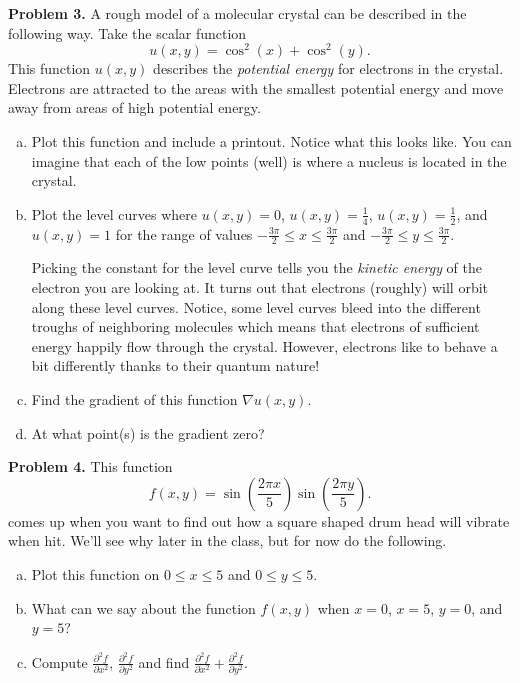 \documentclass[12pt]{report} %
\theoremstyle{definition}
\begin{document}
\noindent\textbf{Problem 3.} A rough model of a molecular crystal can be described in the following way.  Take the scalar function
\[
u(x,y)=\cos^2(x)+\cos^2(y).
\]
This function $u(x,y)$ describes the \emph{potential energy} for electrons in the crystal. Electrons are attracted to the areas with the smallest potential energy and move away from areas of high potential energy. 
\begin{enumerate}[(a)]
    \item Plot this function and include a printout.  Notice what this looks like.  You can imagine that each of the low points (well) is where a nucleus is located in the crystal.
    \item Plot the level curves where $u(x,y)=0$, $u(x,y)=\frac{1}{4}$, $u(x,y)=\frac{1}{2}$, and $u(x,y)=1$ for the range of values $-\frac{3\pi}{2}\leq x \leq \frac{3\pi}{2}$ and $-\frac{3\pi}{2}\leq y \leq \frac{3\pi}{2}$. 
    
    Picking the constant for the level curve tells you the \emph{kinetic energy} of the electron you are looking at.  It turns out that electrons (roughly) will orbit along these level curves.  Notice, some level curves bleed into the different troughs of neighboring molecules which means that electrons of sufficient energy happily flow through the crystal. However, electrons like to behave a bit differently thanks to their quantum nature!
    \item Find the gradient of this function $\nabla u(x,y)$.
    \item At what point(s) is the gradient zero? 
\end{enumerate}   
\vspace*{.5cm}


\noindent\textbf{Problem 4.} This function
\[
f(x,y)=\sin\left(\frac{2\pi x}{5}\right)\sin\left(\frac{2\pi y}{5}\right).
\]
comes up when you want to find out how a square shaped drum head will vibrate when hit. We'll see why later in the class, but for now do the following.
\begin{enumerate}[(a)]
    \item Plot this function on $0\leq x \leq 5$ and $0\leq y \leq 5$.  
    \item What can we say about the function $f(x,y)$ when $x=0$, $x=5$, $y=0$, and $y=5$?
    \item Compute $\frac{\partial^2 f}{\partial x^2}$, $\frac{\partial^2 f}{\partial y^2}$ and find $\frac{\partial^2 f}{\partial x^2}+\frac{\partial^2 f}{\partial y^2}$.
\end{enumerate}
\end{document}
